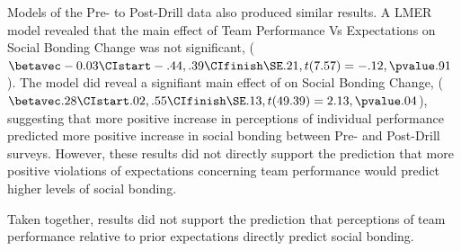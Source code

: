 \begin{CJK}{UTF8}{gbsn}





Models of the Pre- to Post-Drill data also produced similar results.  A LMER model revealed that the main effect of Team Performance Vs Expectations on Social Bonding Change was not significant, ($\betavec -0.03 \CIstart -.44, .39 \CIfinish \SE .21, t(7.57) = -.12, \pvalue .91$). The model did reveal a signifiant main effect of  on Social Bonding Change, ($\betavec .28 \CIstart .02, .55 \CIfinish \SE .13, t(49.39) = 2.13, \pvalue .04$), suggesting that more positive increase in perceptions of individual performance predicted more positive increase in social bonding between Pre- and Post-Drill surveys.  However, these results did not directly support the prediction that more positive violations of expectations concerning team performance would predict higher levels of social bonding.

Taken together, results did not support the prediction that perceptions of team performance relative to prior expectations directly predict social bonding.



\end{CJK}
